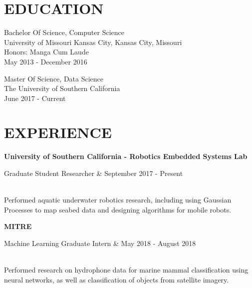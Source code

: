 \documentclass[margin,10pt]{res} %
\begin{document}

\address{ 2650 Van Buren Pl. \\ Los Angeles, California 90007  \\
(913) 908-6148 \\ cdennist@usc.edu \\ http://octopuscabbage.github.io \\}

\begin{resume}
 
\section{EDUCATION}       
 Bachelor Of Science, Computer Science  \\
                University of Missouri Kansas City, Kansas City, Missouri \\ 
                Honors: Manga Cum Laude\\
                May 2013 - December 2016 

 Master Of Science, Data Science \\
    The University of Southern California \\
    June 2017 - Current  
 
 
\section{EXPERIENCE}      
		{\bf University of Southern California - Robotics Embedded Systems Lab} \\
            \begin{ncolumn}{2}
            Graduate Student Researcher & September 2017 - Present
            \end{ncolumn} \\            
            Performed aquatic underwater robotics research, including using Gaussian Processes to map seabed data and designing algorithms for mobile robots.
         
         {\bf MITRE} \\
            \begin{ncolumn}{2}
            Machine Learning Graduate Intern & May 2018 - August 2018
            \end{ncolumn} \\
            Performed research on hydrophone data for marine mammal classification using neural networks, as well as classification of objects from satellite imagery.    
 

\end{resume}
\end{document}
